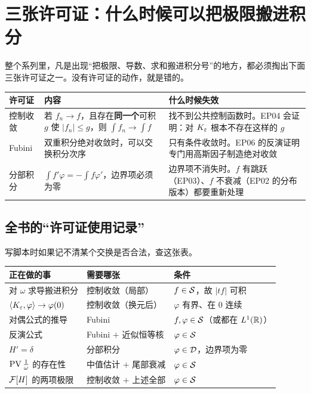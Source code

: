 \section{三张许可证：什么时候可以把极限搬进积分}

整个系列里，凡是出现“把极限、导数、求和搬进积分号”的地方，都必须掏出下面三张许可证之一。没有许可证的动作，就是错的。

\begin{center}
\small
\renewcommand{\arraystretch}{1.5}
\begin{tabularx}{\textwidth}{@{}L{2.2cm}L{5.8cm}Y@{}}
\toprule
许可证 & 内容 & 什么时候失效 \\
\midrule
控制收敛 & 若 $f_n\to f$，且存在\textbf{同一个}可积 $g$ 使 $|f_n|\le g$，则 $\int f_n\to\int f$ & 找不到公共控制函数时。EP04 会证明：对 $K_{\varepsilon}$ 根本不存在这样的 $g$ \\
Fubini & 双重积分绝对收敛时，可以交换积分次序 & 只有条件收敛时。EP06 的反演证明专门用高斯因子制造绝对收敛 \\
分部积分 & $\int f'\varphi=-\int f\varphi'$，边界项必须为零 & 边界项不消失时。$f$ 有跳跃（EP03）、$f$ 不衰减（EP02 的分布版本）都要重新处理 \\
\bottomrule
\end{tabularx}
\end{center}

\subsection*{全书的“许可证使用记录”}

写脚本时如果记不清某个交换是否合法，查这张表。

\begin{center}
\small
\renewcommand{\arraystretch}{1.45}
\begin{tabularx}{\textwidth}{@{}L{5.4cm}L{3.6cm}Y@{}}
\toprule
正在做的事 & 需要哪张 & 条件 \\
\midrule
对 $\omega$ 求导搬进积分 & 控制收敛（局部） & $f\in\mathcal{S}$，故 $|tf|$ 可积 \\
$\langle K_{\varepsilon},\varphi\rangle\to\varphi(0)$ & 控制收敛（换元后） & $\varphi$ 有界、在 $0$ 连续 \\
对偶公式的推导 & Fubini & $f,\varphi\in\mathcal{S}$（或都在 $L^1(\mathbb{R})$） \\
反演公式 & Fubini $+$ 近似恒等核 & $\varphi\in\mathcal{S}$ \\
$H'=\delta$ & 分部积分 & $\varphi\in\mathcal{D}$，边界项为零 \\
$\operatorname{PV}\frac{1}{\omega}$ 的存在性 & 中值估计 $+$ 尾部衰减 & $\varphi\in\mathcal{S}$ \\
$\mathcal{F}[H]$ 的两项极限 & 控制收敛 $+$ 上述全部 & $\varphi\in\mathcal{S}$ \\
\bottomrule
\end{tabularx}
\end{center}

